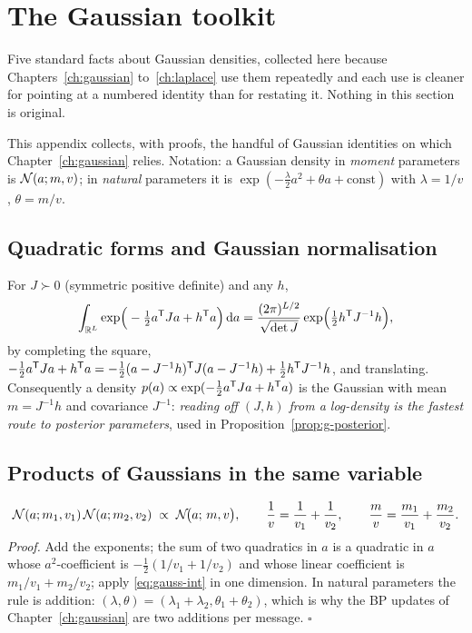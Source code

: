 \section{The Gaussian toolkit}\label{app:gauss}\label{sec:gauss-toolkit}

Five standard facts about Gaussian densities, collected here because
Chapters~\ref{ch:gaussian} to~\ref{ch:laplace} use them repeatedly and each
use is cleaner for pointing at a numbered identity than for restating it.
Nothing in this section is original.

This appendix collects, with proofs, the handful of Gaussian identities on
which Chapter~\ref{ch:gaussian} relies. Notation: a Gaussian
density in \emph{moment} parameters is $\mathcal{N}(a; m, v)$; in \emph{natural}
parameters it is
$\exp(-\tfrac{\lambda}{2} a^2 + \theta a + \mathrm{const})$ with
$\lambda = 1/v$, $\theta = m/v$.

\subsection{Quadratic forms and Gaussian normalisation}

For $J \succ 0$ (symmetric positive definite) and any $h$,
\begin{equation}
  \int_{\mathbb{R}^L} \exp\!\Big( -\tfrac{1}{2} a^{\mathsf{T}} J a + h^{\mathsf{T}} a \Big)\, \mathrm{d} a
  = \frac{(2\pi)^{L/2}}{\sqrt{\det J}}
    \exp\!\Big( \tfrac{1}{2} h^{\mathsf{T}} J^{-1} h \Big),
  \label{eq:gauss-int}
\end{equation}
by completing the square, $-\tfrac{1}{2}a^{\mathsf{T}} J a + h^{\mathsf{T}} a =
-\tfrac{1}{2}(a - J^{-1}h)^{\mathsf{T}} J (a - J^{-1}h) + \tfrac{1}{2} h^{\mathsf{T}} J^{-1}h$,
and translating. Consequently a density
$p(a) \propto \exp(-\tfrac{1}{2} a^{\mathsf{T}} J a + h^{\mathsf{T}} a)$ is the Gaussian with
mean $m = J^{-1} h$ and covariance $J^{-1}$: \emph{reading off $(J, h)$
from a log-density is the fastest route to posterior parameters}, used in
Proposition~\ref{prop:g-posterior}.

\subsection{Products of Gaussians in the same variable}

\begin{equation}
  \mathcal{N}(a; m_1, v_1)\, \mathcal{N}(a; m_2, v_2)
  \;\propto\; \mathcal{N}\!\big(a;\, m, v\big),
  \qquad
  \frac{1}{v} = \frac{1}{v_1} + \frac{1}{v_2},
  \qquad
  \frac{m}{v} = \frac{m_1}{v_1} + \frac{m_2}{v_2}.
  \label{eq:gauss-product}
\end{equation}
\emph{Proof.} Add the exponents; the sum of two quadratics in $a$ is a
quadratic in $a$ whose $a^2$-coefficient is
$-\tfrac{1}{2}(1/v_1 + 1/v_2)$ and whose linear coefficient is
$m_1/v_1 + m_2/v_2$; apply \eqref{eq:gauss-int} in one dimension. In
natural parameters the rule is addition:
$(\lambda, \theta) = (\lambda_1 + \lambda_2, \theta_1 + \theta_2)$,
which is why the BP updates of Chapter~\ref{ch:gaussian} are two
additions per message. $\square$

